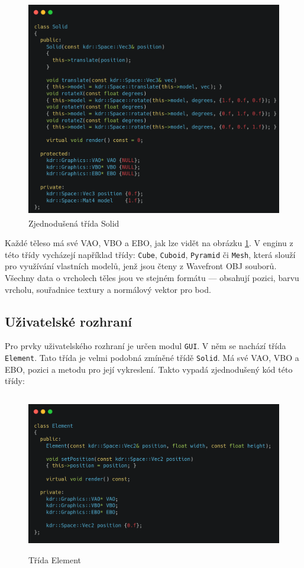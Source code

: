 \documentclass[12pt]{article}
\begin{document}
\vspace{0.5cm}
\begin{figure}[!h]
    \centering
    \includegraphics[height=9.5cm]{images/solid.png}
    \caption{Zjednodušená třída Solid}
    \label{fig:Zjednodušená třída Solid}
\end{figure}

Každé těleso má své VAO, VBO a EBO, jak lze vidět na obrázku \ref{fig:Zjednodušená třída Solid}. V enginu z této třídy vycházejí například třídy: \texttt{Cube}, \texttt{Cuboid}, \texttt{Pyramid} či \texttt{Mesh}, která slouží pro využívání vlastních modelů, jenž jsou čteny z Wavefront OBJ \cite{wavefront} souborů. Všechny data o vrcholech těles jsou ve stejném formátu — obsahují pozici, barvu vrcholu, souřadnice textury a normálový vektor pro bod.

\subsection{Uživatelské rozhraní}

Pro prvky uživatelského rozhraní je určen modul \texttt{GUI}. V něm se nachází třída \texttt{Element}. Tato třída je velmi podobná zmíněné třídě \texttt{Solid}. Má své VAO, VBO a EBO, pozici a metodu pro její vykreslení. Takto vypadá zjednodušený kód této třídy:

\vspace{0.5cm}
\begin{figure}[h]
    \centering
    \includegraphics[height=7cm]{images/element.png}
    \caption{Třída Element}
    \label{fig:Třída Element}
\end{figure}
\end{document}
